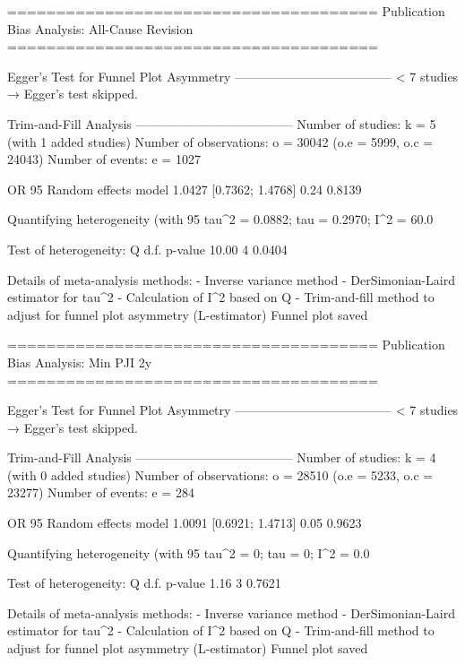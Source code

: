 ======================================
Publication Bias Analysis: All-Cause Revision 
======================================
                                                                                                                                                        
Egger's Test for Funnel Plot Asymmetry
--------------------------------------
  < 7 studies → Egger’s test skipped.

Trim-and-Fill Analysis
--------------------------------------
Number of studies: k = 5 (with 1 added studies)
Number of observations: o = 30042 (o.e = 5999, o.c = 24043)
Number of events: e = 1027

                         OR           95%
Random effects model 1.0427 [0.7362; 1.4768] 0.24  0.8139

Quantifying heterogeneity (with 95%
 tau^2 = 0.0882; tau = 0.2970; I^2 = 60.0%

Test of heterogeneity:
     Q d.f. p-value
 10.00    4  0.0404

Details of meta-analysis methods:
- Inverse variance method
- DerSimonian-Laird estimator for tau^2
- Calculation of I^2 based on Q
- Trim-and-fill method to adjust for funnel plot asymmetry (L-estimator)
  Funnel plot saved

======================================
Publication Bias Analysis: Min PJI 2y 
======================================
                                                                                                                                                        
Egger's Test for Funnel Plot Asymmetry
--------------------------------------
  < 7 studies → Egger’s test skipped.

Trim-and-Fill Analysis
--------------------------------------
Number of studies: k = 4 (with 0 added studies)
Number of observations: o = 28510 (o.e = 5233, o.c = 23277)
Number of events: e = 284

                         OR           95%
Random effects model 1.0091 [0.6921; 1.4713] 0.05  0.9623

Quantifying heterogeneity (with 95%
 tau^2 = 0; tau = 0; I^2 = 0.0%

Test of heterogeneity:
    Q d.f. p-value
 1.16    3  0.7621

Details of meta-analysis methods:
- Inverse variance method
- DerSimonian-Laird estimator for tau^2
- Calculation of I^2 based on Q
- Trim-and-fill method to adjust for funnel plot asymmetry (L-estimator)
  Funnel plot saved

